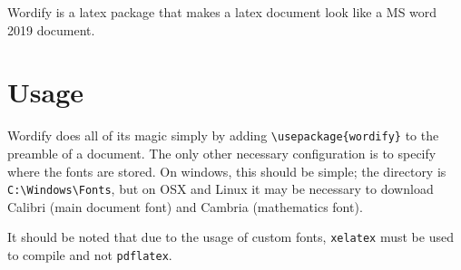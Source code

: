 \documentclass[11pt]{article}
\begin{document}
Wordify is a latex package that makes a latex document look like a MS word 2019 document.

\section{Usage}

Wordify does all of its magic simply by adding \texttt{{\textbackslash}usepackage\{wordify\}} to the preamble of a document. The only other necessary configuration is to specify where the fonts are stored. On windows, this should be simple; the directory is \texttt{C:{\textbackslash}Windows{\textbackslash}Fonts}, but on OSX and Linux it may be necessary to download Calibri (main document font) and Cambria (mathematics font).

It should be noted that due to the usage of custom fonts, \texttt{xelatex} must be used to compile and not \texttt{pdflatex}.
\end{document}
